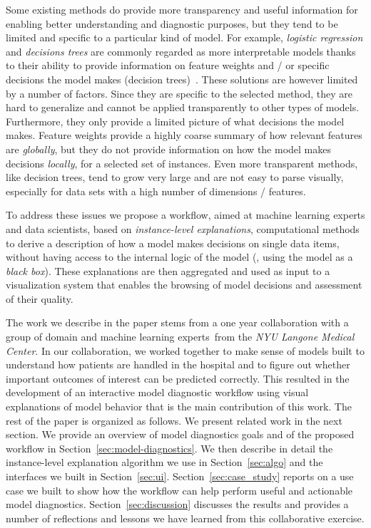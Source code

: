 Some existing methods do provide more transparency and useful information for enabling better understanding and diagnostic purposes, but they tend to be limited and specific to a particular kind of model. For example, \textit{logistic regression} and \textit{decisions trees} are commonly regarded as more interpretable models thanks to their ability to provide information on feature weights and / or specific decisions the model makes (decision trees)~\cite{freitas2014comprehensible}. These solutions are however limited by a number of factors. Since they are specific to the selected method, they are hard to generalize and cannot be applied transparently to other types of models. Furthermore, they only provide a limited picture of what decisions the model makes. Feature weights provide a highly coarse summary of how relevant features are \textit{globally}, but they do not provide information on how the model makes decisions \textit{locally}, for a selected set of instances. Even more transparent methods, like decision trees, tend to grow very large and are not easy to parse visually, especially for data sets with a high number of dimensions / features.



To address these issues we propose a workflow, aimed at machine learning experts and data scientists, based on \textit{instance-level explanations}, computational methods to derive a description of how a model makes decisions on single data items, without having access to the internal logic of the model (\ie, using the model as a \textit{black box}). These explanations are then aggregated and used as input to a visualization system that enables the browsing of model decisions and assessment of their quality.

The work we describe in the paper stems from a one year collaboration with a group of domain and machine learning experts~from the \textit{NYU Langone Medical Center}.
In our collaboration, we worked together to make sense of models built to understand how patients are handled in the hospital and to figure out whether important outcomes of interest can be predicted correctly. This resulted in the development of an interactive model diagnostic workflow using visual explanations of model behavior that is the main contribution of this work.
The rest of the paper is organized as follows. We present related work in the next section. We provide an overview of model diagnostics goals and of the proposed workflow in Section~\ref{sec:model-diagnostics}. We then describe in detail the instance-level explanation algorithm we use in Section~\ref{sec:algo} and the interfaces we built in Section~\ref{sec:ui}. Section~\ref{sec:case_study} reports on a use case we built to show how the workflow can help perform useful and actionable model diagnostics. Section~\ref{sec:discussion} discusses the results and provides a number of reflections and lessons we have learned from this collaborative exercise.

